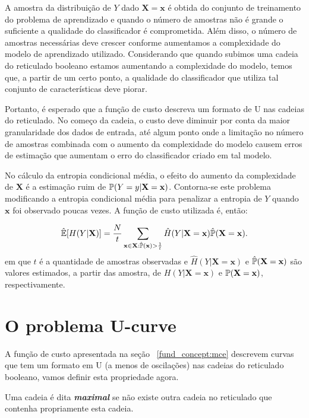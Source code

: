 A amostra da distribuição de $Y$ dado $\mathbf{X = x}$ é obtida do 
conjunto de treinamento do problema de aprendizado e quando o número
de amostras não é grande o suficiente a qualidade do classificador 
é comprometida. Além disso, o número de amostras necessárias deve
crescer conforme aumentamos a complexidade do modelo de aprendizado 
utilizado. Considerando que quando subimos uma cadeia do reticulado 
booleano estamos aumentando a complexidade do modelo, temos que, a
partir de um certo ponto, a qualidade do classificador que utiliza tal 
conjunto de características deve piorar. 

Portanto, é esperado que a função de custo descreva um formato de U nas 
cadeias do reticulado. No começo da cadeia, o custo deve diminuir por 
conta da maior granularidade dos dados de entrada, até algum ponto onde
a limitação no número de amostras combinada com o aumento da 
complexidade do modelo causem erros de estimação que aumentam o erro
do classificador criado em tal modelo.

No cálculo da entropia condicional média, o efeito do aumento da 
complexidade de $\mathbf X$ é a estimação ruim de 
$\mathbb{P} (Y = y | \mathbf{X = x})$. Contorna-se este problema 
modificando a entropia condicional média para penalizar a entropia de 
$Y$ quando $\mathbf{x}$ foi observado poucas vezes. A função de custo
utilizada é, então:

\begin{equation} \label{cost_function:mce}
    \hat{\mathbb{E}}[H (Y | \mathbf{X})] = \frac{N}{t}
    \sum_{\mathbf{x} \in \mathbf{X} : \hat{\mathbb{P}}{(\mathbf{x}}) > {1 \over t}} 
        \hat{H} (Y | \mathbf{X = x}) \hat{\mathbb{P}} (\mathbf{X = x}).
\end{equation}
em que $t$ é a quantidade de amostras observadas e 
$\hat{H}(Y | \mathbf{X = x})$ e $\hat{\mathbb{P}}(\mathbf{X = x})$ são
valores estimados, a partir das amostra, de $H(Y | \mathbf{X = x})$ e 
$\mathbb{P}(\mathbf{X = x})$, respectivamente.

\section{O problema U-curve}
A função de custo apresentada na seção ~\ref{fund_concept:mce}
descrevem curvas que tem um formato em U (a menos de oscilações) nas 
cadeias do reticulado booleano, vamos definir esta propriedade agora.

\begin{mydefinition}
Uma cadeia é dita {\bf \em maximal} se não existe outra cadeia no 
reticulado que contenha propriamente esta cadeia.
\end{mydefinition}

